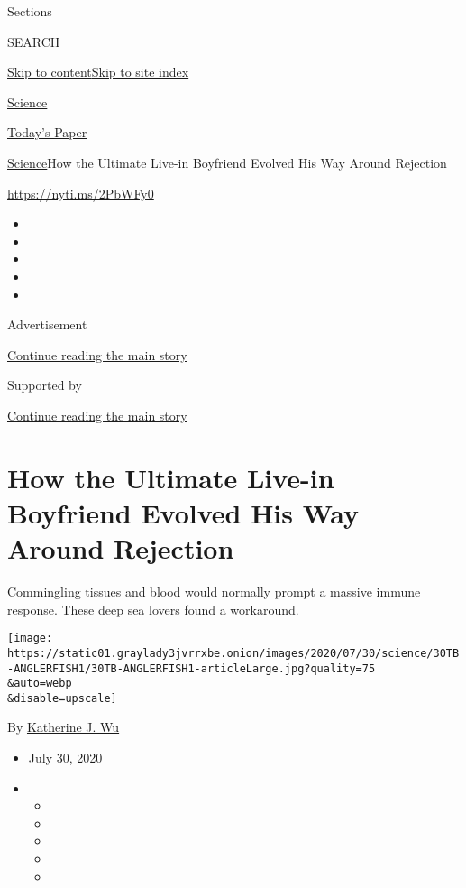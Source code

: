 Sections

SEARCH

\protect\hyperlink{site-content}{Skip to
content}\protect\hyperlink{site-index}{Skip to site index}

\href{https://www.nytimes3xbfgragh.onion/section/science}{Science}

\href{https://myaccount.nytimes3xbfgragh.onion/auth/login?response_type=cookie\&client_id=vi}{}

\href{https://www.nytimes3xbfgragh.onion/section/todayspaper}{Today's
Paper}

\href{/section/science}{Science}\textbar{}How the Ultimate Live-in
Boyfriend Evolved His Way Around Rejection

\url{https://nyti.ms/2PbWFy0}

\begin{itemize}
\item
\item
\item
\item
\item
\end{itemize}

Advertisement

\protect\hyperlink{after-top}{Continue reading the main story}

Supported by

\protect\hyperlink{after-sponsor}{Continue reading the main story}

\hypertarget{how-the-ultimate-live-in-boyfriend-evolved-his-way-around-rejection}{%
\section{How the Ultimate Live-in Boyfriend Evolved His Way Around
Rejection}\label{how-the-ultimate-live-in-boyfriend-evolved-his-way-around-rejection}}

Commingling tissues and blood would normally prompt a massive immune
response. These deep sea lovers found a workaround.

\texttt{[image: https://static01.graylady3jvrrxbe.onion/images/2020/07/30/science/30TB-ANGLERFISH1/30TB-ANGLERFISH1-articleLarge.jpg?quality=75\\\&auto=webp\\\&disable=upscale]}

By
\href{https://www.nytimes3xbfgragh.onion/by/katherine-j--wu}{Katherine
J. Wu}

\begin{itemize}
\item
  July 30, 2020
\item
  \begin{itemize}
  \item
  \item
  \item
  \item
  \item
  \end{itemize}
\end{itemize}

